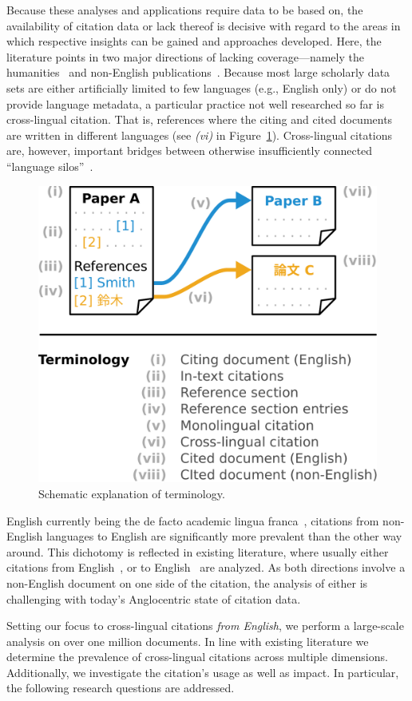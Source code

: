 Because these analyses and applications require data to be based on, the availability of citation data or lack thereof is decisive with regard to the areas in which respective insights can be gained and approaches developed. Here, the literature points 
in two major directions of lacking coverage---namely the humanities~\cite{Colavizza2019,Kellsey2004} and non-English publications~\cite{Vera-Baceta2019,Liu2019,Moed2018,Moskaleva2019,MartinMartin2021}.
Because most large scholarly data sets are either artificially limited to few languages (e.g., English only) or do not provide language metadata,
a particular practice not well researched so far is cross-lingual citation. That is, references where the citing and cited documents are written in different languages (see \textit{(vi)} in Figure~\ref{fig:terminology}).
Cross-lingual citations are, however, important bridges between otherwise insufficiently connected ``language silos''~\cite{Shu2019,Moskaleva2019}.

\begin{figure}[b] %
\centering
\includegraphics[width=0.5\linewidth]{figures/ref_xling/terminology_with_text_twocolumn.pdf}
\caption{Schematic explanation of terminology.} \label{fig:terminology}
\end{figure}

English currently being the de facto academic lingua franca~\cite{Montgomery2013}, citations from non-English languages to English are significantly more prevalent than the other way around. This dichotomy is reflected in existing literature, where usually either citations from English~\cite{Kellsey2004,Lillis2010}, or to English~\cite{Tang2014,Jiang2018,Jiang2018b,Schrader2019} are analyzed. As both directions involve a non-English document on one side of the citation, the analysis of either is challenging with today's Anglocentric state of citation data.

Setting our focus to cross-lingual citations \emph{from English}, we perform a large-scale analysis on over one million documents.
In line with existing literature we determine the prevalence of cross-lingual citations across multiple dimensions. Additionally, we investigate the citation's usage as well as impact. In particular, the following research questions are addressed.

